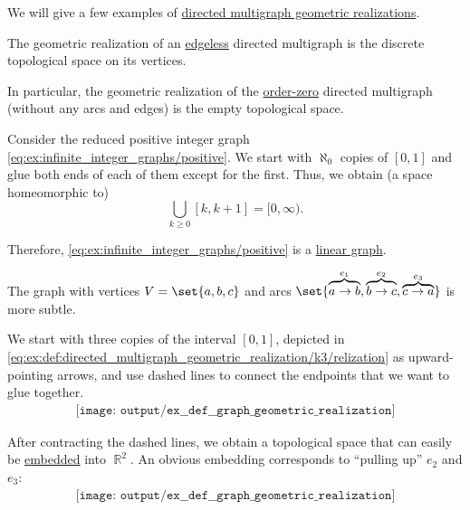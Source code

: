 \begin{example}\label{ex:def:directed_multigraph_geometric_realization}
  We will give a few examples of \hyperref[def:directed_multigraph_geometric_realization/undirected]{directed multigraph geometric realizations}.

  \begin{thmenum}
     The geometric realization of an \hyperref[def:hypergraph/trivial]{edgeless} directed multigraph is the discrete topological space on its vertices.

    In particular, the geometric realization of the \hyperref[def:hypergraph/trivial]{order-zero} directed multigraph (without any arcs and edges) is the empty topological space.

     Consider the reduced positive integer graph \eqref{eq:ex:infinite_integer_graphs/positive}. We start with \( \aleph_0 \) copies of \( [0, 1] \) and glue both ends of each of them except for the first. Thus, we obtain (a space homeomorphic to)
    \begin{equation*}
      \bigcup_{k \geq 0} [k, k + 1] = [0, \infty).
    \end{equation*}

    Therefore, \eqref{eq:ex:infinite_integer_graphs/positive} is a \hyperref[def:directed_multigraph_geometric_realization/linear]{linear graph}.

     The graph with vertices \( V = \set{ a, b, c } \) and arcs \( \set{ \overbrace{a \to b}^{e_1}, \overbrace{b \to c}^{e_2}, \overbrace{c \to a}^{e_3} } \) is more subtle.

    We start with three copies of the interval \( [0, 1] \), depicted in \eqref{eq:ex:def:directed_multigraph_geometric_realization/k3/relization} as upward-pointing arrows, and use dashed lines to connect the endpoints that we want to glue together.
    \begin{equation}\label{eq:ex:def:directed_multigraph_geometric_realization/k3/relization}
      \begin{aligned}
        \texttt{[image: output/ex\_\_def\_\_graph\_geometric\_realization]}
      \end{aligned}
    \end{equation}

    After contracting the dashed lines, we obtain a topological space that can easily be \hyperref[def:directed_multigraph_geometric_realization/embedding]{embedded} into \( \BbbR^2 \). An obvious embedding corresponds to \enquote{pulling up} \( e_2 \) and \( e_3 \):
    \begin{equation}\label{eq:ex:def:directed_multigraph_geometric_realization/k3/embedding}
      \begin{aligned}
        \texttt{[image: output/ex\_\_def\_\_graph\_geometric\_realization]}
      \end{aligned}
    \end{equation}


\end{thmenum}
\end{example}
